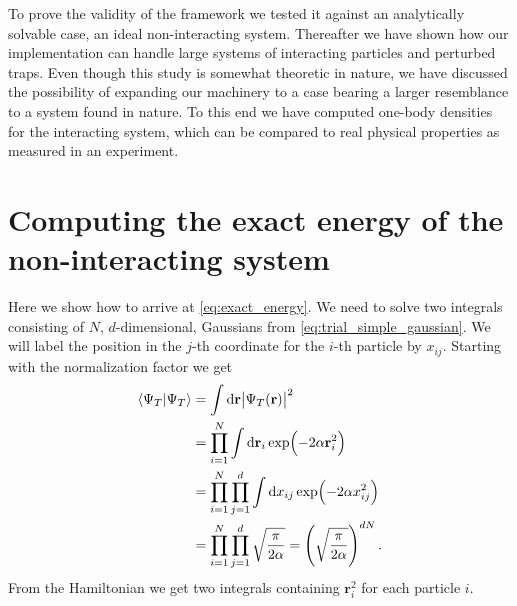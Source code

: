 \documentclass[
    a4paper, aps, twocolumn, floatfix, superscriptaddress,
    nofootinbib]{revtex4-1}
\newcommand{\vf}{\mathbf}
\newcommand{\1}{\mathds{1}}
\newcommand{\para}[1]{\left(#1\right)}
\begin{document}
    To prove the validity of the framework we tested it against an analytically
    solvable case, an ideal non-interacting system. Thereafter we have shown how
    our implementation can handle large systems of interacting particles and
    perturbed traps. Even though this study is somewhat theoretic in nature, we
    have discussed the possibility of expanding our machinery to a case bearing
    a larger resemblance to a system found in nature. To this end we have
    computed one-body densities for the interacting system, which can be
    compared to real physical properties as measured in an experiment.



\clearpage

\appendix
\section{Computing the exact energy of the non-interacting system}
    Here we show how to arrive at \autoref{eq:exact_energy}. We need to solve
    two integrals consisting of $N$, $d$-dimensional, Gaussians from
    \autoref{eq:trial_simple_gaussian}. We will label the position in the $j$-th
    coordinate for the $i$-th particle by $x_{ij}$. Starting with the
    normalization factor we get
    \begin{align}
        \bra{\Psi_T}\ket{\Psi_T}
        &=
        \int\dd\vf{r}\abs{\Psi_T(\vf{r})}^2
        \\
        &=
        \prod_{i = 1}^N
        \int\dd\vf{r}_i\exp(-2\alpha\vf{r}_i^2)
        \\
        &=
        \prod_{i = 1}^N
        \prod_{j = 1}^d
        \int\dd x_{ij}\exp(-2\alpha x_{ij}^2)
        \\
        &=
        \prod_{i = 1}^N
        \prod_{j = 1}^d
        \sqrt{\frac{\pi}{2\alpha}}
        = \para{
            \sqrt{\frac{\pi}{2\alpha}}
        }^{dN}.
    \end{align}
    From the Hamiltonian we get two integrals containing $\vf{r}_i^2$ for each
    particle $i$.
\end{document}
